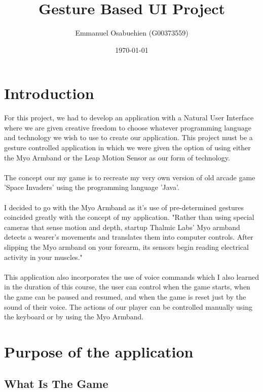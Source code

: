 \documentclass{article}
\title{Gesture Based UI Project}
\author{Emmanuel Osabuehien (G00373559)}
\date{\today}
\begin{document}
\maketitle

\tableofcontents

\pagebreak

\section{Introduction}

For this project, we had to develop an application with a Natural User Interface where we are given creative freedom to choose whatever programming language and technology we wish to use to create our application. This project must be a gesture controlled application in which we were given the option of using either the Myo Armband or the Leap Motion Sensor as our form of technology.\\ \\
The concept our my game is to recreate my very own version of old arcade game 'Space Invaders' using the programming language 'Java'.\\ \\
I decided to go with the Myo Armband as it's use of pre-determined gestures coincided greatly with the concept of my application. "Rather than using special cameras that sense motion and depth, startup Thalmic Labs' Myo armband detects a wearer's movements and translates them into computer controls. After slipping the Myo armband on your forearm, its sensors begin reading electrical activity in your muscles."\\ \\
This application also incorporates the use of voice commands which I also learned in the duration of this course, the user can control when the game starts, when the game can be paused and resumed, and when the game is reset just by the sound of their voice. The actions of our player can be controlled manually using the keyboard or by using the Myo Armband.

\section{Purpose of the application}

\subsection{What Is The Game}
\end{document}
